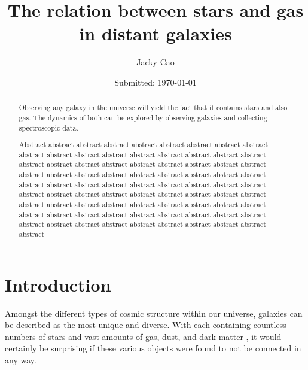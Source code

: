 \documentclass[12pt, twocolumn]{revtex4}    %
\begin{document}
                     


\title{The relation between stars and gas in distant galaxies} 
\date{Submitted: \today{}}
\author{Jacky Cao}

\begin{abstract}              
 
 Observing any galaxy in the universe will yield the fact that it contains stars and also gas. The dynamics of both can be explored by observing galaxies and collecting spectroscopic data. 
 
Abstract abstract abstract abstract abstract abstract abstract abstract abstract abstract abstract abstract abstract abstract abstract abstract abstract abstract abstract abstract abstract abstract abstract abstract abstract abstract abstract abstract abstract abstract abstract abstract abstract abstract abstract abstract abstract abstract abstract abstract abstract abstract abstract abstract abstract abstract abstract abstract abstract abstract abstract abstract abstract abstract abstract abstract abstract abstract abstract abstract abstract abstract abstract abstract abstract abstract abstract abstract abstract abstract abstract abstract abstract abstract abstract abstract abstract abstract abstract abstract abstract abstract 

\end{abstract}

\maketitle

\tableofcontents

\newpage

\section{Introduction} 

Amongst the different types of cosmic structure within our universe, galaxies can be described as the most unique and diverse. With each containing countless numbers of stars and vast amounts of gas, dust, and dark matter \citep{carroll_astro}, it would certainly be surprising if these various objects were found to not be connected in any way.
\end{document}

